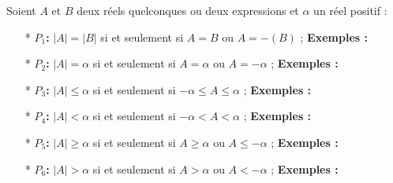 \documentclass[12pt]{article}
\begin{document}
Soient $A$ et $B$ deux réels quelconques ou deux expressions et $\alpha$ un réel positif :
\begin{itemize}
    \item[*] \textbf{ $P_1$:} $|A| = |B|$ si et seulement si $A = B$ ou $A = -(B)$ ;  
    \textbf{Exemples :}
    \item[*] \textbf{ $P_2$:} $|A| = \alpha$ si et seulement si $A = \alpha$ ou $A = -\alpha$ ;  
    \textbf{Exemples :}
    \item[*] \textbf{ $P_3$:} $|A| \leq \alpha$ si et seulement si $-\alpha \leq A \leq \alpha$ ;  
    \textbf{Exemples :}
    \item[*] \textbf{ $P_4$:} $|A| < \alpha$ si et seulement si $-\alpha < A < \alpha$ ;  
    \textbf{Exemples :}
    \item[*] \textbf{ $P_5$:} $|A| \geq \alpha$ si et seulement si $A \geq \alpha$ ou $A \leq -\alpha$ ;  
    \textbf{Exemples :}
    \item[*] \textbf{ $P_6$:} $|A| > \alpha$ si et seulement si $A > \alpha$ ou $A < -\alpha$ ;  
    \textbf{Exemples :}
\end{itemize}
\end{document}
